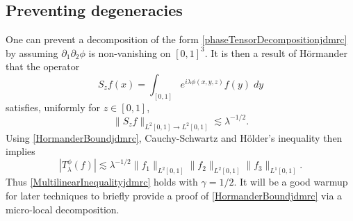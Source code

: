 \documentclass[12pt]{amsart}
\begin{document}
\subsection{Preventing degeneracies}

One can prevent a decomposition of the form \eqref{phaseTensorDecompositionjdmrc} by assuming $\partial_1 \partial_2 \phi$ is non-vanishing on $[0,1]^3$. It is then a result of H\"{o}rmander \cite{Hormanderjdmrc} that the operator
%
\begin{equation}
    S_zf(x) = \int_{[0,1]} e^{i \lambda \phi(x,y,z)} f(y)\; dy
\end{equation}
%
satisfies, uniformly for $z \in [0,1]$,
%
\begin{equation} \label{HormanderBoundjdmrc}
    \| S_z f \|_{L^2[0,1] \to L^2[0,1]} \lesssim \lambda^{-1/2}.
\end{equation}
%
Using \eqref{HormanderBoundjdmrc}, Cauchy-Schwartz and H\"{o}lder's inequality then implies
%
\begin{equation} \label{HormanderL2L2L1Boundjdmrc}
    |T^\phi_\lambda(f)| \lesssim \lambda^{-1/2} \| f_1 \|_{L^2[0,1]} \| f_2 \|_{L^2[0,1]} \| f_3 \|_{L^1[0,1]}.
\end{equation}
%
Thus \eqref{MultilinearInequalityjdmrc} holds with $\gamma = 1/2$. It will be a good warmup for later techniques to briefly provide a proof of \eqref{HormanderBoundjdmrc} via a micro-local decomposition.
\end{document}

